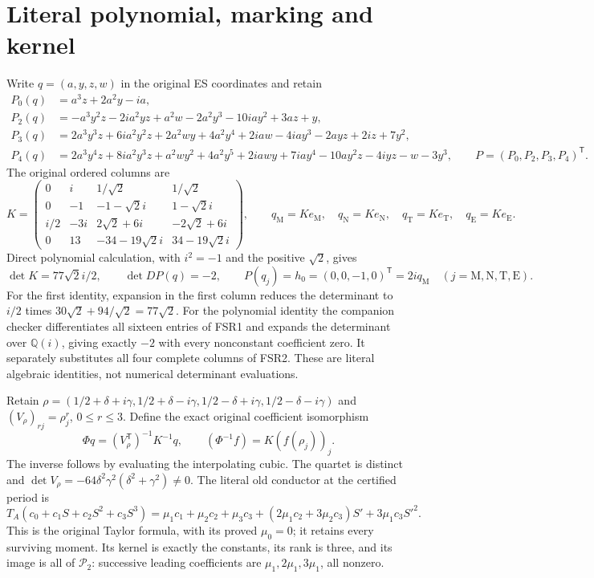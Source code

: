 \section{Literal polynomial, marking and kernel}
Write $q=(a,y,z,w)$ in the original ES coordinates and retain
\[
\begin{aligned}
 P_0(q)&=a^3z+2a^2y-ia,\\
 P_2(q)&=-a^3y^2z-2ia^2yz+a^2w-2a^2y^3-10iay^2+3az+y,\\
 P_3(q)&=2a^3y^3z+6ia^2y^2z+2a^2wy+4a^2y^4
          +2iaw-4iay^3-2ayz+2iz+7y^2,\\
 P_4(q)&=2a^3y^4z+8ia^2y^3z+a^2wy^2+4a^2y^5
          +2iawy+7iay^4-10ay^2z-4iyz-w-3y^3,
 \qquad P=(P_0,P_2,P_3,P_4)^{\mathsf T}.
\end{aligned}\tag{FSR1}
\]
The original ordered columns are
\[
 K=\begin{pmatrix}
 0&i&1/\sqrt2&1/\sqrt2\\
 0&-1&-1-\sqrt2i&1-\sqrt2i\\
 i/2&-3i&2\sqrt2+6i&-2\sqrt2+6i\\
 0&13&-34-19\sqrt2i&34-19\sqrt2i
 \end{pmatrix},\qquad
 q_{\mathrm M}=Ke_{\mathrm M},\quad q_{\mathrm N}=Ke_{\mathrm N},
 \quad q_{\mathrm T}=Ke_{\mathrm T},\quad q_{\mathrm E}=Ke_{\mathrm E}.
 \tag{FSR2}
\]
Direct polynomial calculation, with $i^2=-1$ and the positive
$\sqrt2$, gives
\[
 \det K=77\sqrt2i/2,\qquad \det DP(q)=-2,\qquad
 P(q_j)=h_0=(0,0,-1,0)^{\mathsf T}=2iq_{\mathrm M}
       \quad(j=\mathrm M,\mathrm N,\mathrm T,\mathrm E).
 \tag{FSR3}
\]
For the first identity, expansion in the first column reduces
the determinant to $i/2$ times $30\sqrt2+94/\sqrt2=77\sqrt2$.
For the polynomial identity the companion checker differentiates
all sixteen entries of FSR1 and expands the determinant over
$\mathbb Q(i)$, giving exactly $-2$ with every nonconstant
coefficient zero. It separately substitutes all four complete
columns of FSR2. These are literal algebraic identities, not
numerical determinant evaluations.

Retain
$\rho=(1/2+\delta+i\gamma,1/2+\delta-i\gamma,
1/2-\delta+i\gamma,1/2-\delta-i\gamma)$ and
$(V_\rho)_{rj}=\rho_j^r$, $0\le r\le3$. Define the exact original
coefficient isomorphism
\[
 \Phi q=(V_\rho^{\mathsf T})^{-1}K^{-1}q,
 \qquad (\Phi^{-1}f)=K(f(\rho_j))_j.
 \tag{FSR4}
\]
The inverse follows by evaluating the interpolating cubic. The
quartet is distinct and
$\det V_\rho=-64\delta^2\gamma^2(\delta^2+\gamma^2)\ne0$.
The literal old conductor at the certified period is
\[
 T_A(c_0+c_1S+c_2S^2+c_3S^3)
  =\mu_1c_1+\mu_2c_2+\mu_3c_3
        +(2\mu_1c_2+3\mu_2c_3)S'+3\mu_1c_3S'^2.
 \tag{FSR5}
\]
This is the original Taylor formula, with its proved $\mu_0=0$;
it retains every surviving moment. Its kernel is exactly the
constants, its rank is three, and its image is all of
$\mathcal P_2$: successive leading coefficients are
$\mu_1,2\mu_1,3\mu_1$, all nonzero.


